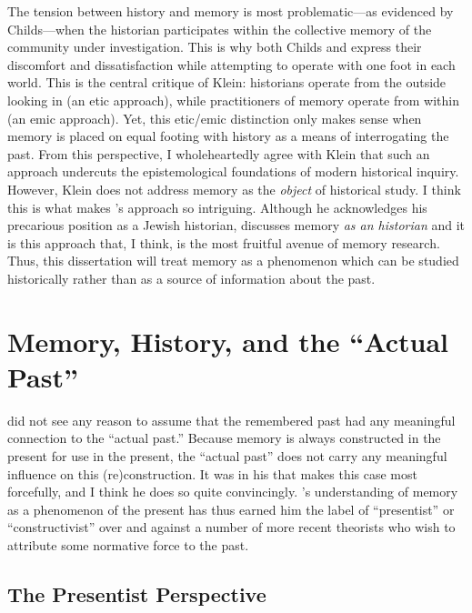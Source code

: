 The tension between history and memory is most problematic---as evidenced by Childs---when the historian participates within the collective memory of the community under investigation. This is why both Childs and \yerushalmi express their discomfort and dissatisfaction while attempting to operate with one foot in each world. This is the central critique of Klein: historians operate from the outside looking in (an etic approach), while practitioners of memory operate from within (an emic approach). Yet, this etic/emic distinction only makes sense when memory is placed on equal footing with history as a means of interrogating the past. From this perspective, I wholeheartedly agree with Klein that such an approach undercuts the epistemological foundations of modern historical inquiry. However, Klein does not address memory as the \emph{object} of historical study. I think this is what makes \yerushalmi's approach so intriguing. Although he acknowledges his precarious position as a Jewish historian, \yerushalmi discusses memory \emph{as an historian} and it is this approach that, I think, is the most fruitful avenue of memory research. Thus, this dissertation will treat memory as a phenomenon which can be studied historically rather than as a source of information about the past.

\section{Memory, History, and the ``Actual Past''}

\halbwachs did not see any reason to assume that the remembered past had any meaningful connection to the ``actual past.'' Because memory is always constructed in the present for use in the present, the ``actual past'' does not carry any meaningful influence on this (re)construction. It was in his  that \halbwachs makes this case most forcefully, and I think he does so quite convincingly. \halbwachs's understanding of memory as a phenomenon of the present has thus earned him the label of ``presentist'' or ``constructivist'' over and against a number of more recent theorists who wish to attribute some normative force to the past.%
    \autocite[27--30]{coser_halbwachs1992}  

\subsection{The Presentist Perspective}  

